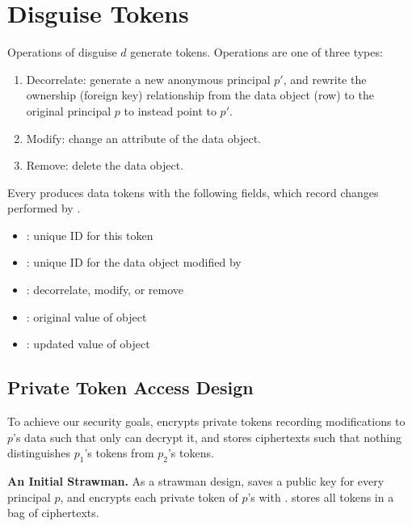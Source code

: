 \section{Disguise Tokens}

Operations  of disguise $d$ generate tokens. Operations are one of three types:
\begin{enumerate}
    \item Decorrelate: generate a new anonymous principal $p'$, and rewrite the ownership (foreign key)
        relationship from the data object (row) to the original principal $p$ to instead point to $p'$.
    \item Modify: change an attribute of the data object.
    \item Remove: delete the data object.
\end{enumerate}

\noindent
Every  produces data tokens  with the following fields, which record changes
performed by .
\begin{itemize}
\item {}:  unique ID for this token
\item {}:  unique ID for the data object modified by 
\item {}:  decorrelate, modify, or remove
\item {}:  original value of object 
\item {}:  updated value of object 
\end{itemize}


\subsection{Private Token Access Design}

To achieve our security goals, \sys encrypts private tokens recording modifications to $p$'s data such that only  can
decrypt it, and stores ciphertexts such that nothing distinguishes $p_1$'s tokens from $p_2$'s
tokens.

\vspace{6pt}
\noindent\textbf{An Initial Strawman.}
As a strawman design, \sys saves a public key  for every principal $p$, and 
encrypts each private token of $p$'s with . 
\sys stores all tokens in a bag of ciphertexts.

